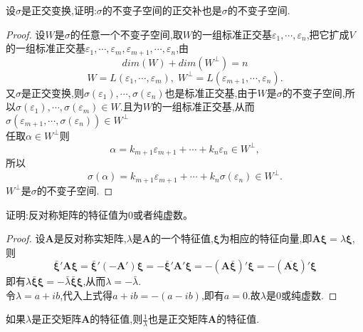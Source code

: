 \documentclass[lang=cn,11pt,normal]{elegantbook}
\renewcommand{\AA}{\boldsymbol{A}}
\newcommand{\varep}{\varepsilon}
\begin{document}
	\begin{exercise}
		设$\sigma$是正交变换,证明:$\sigma$的不变子空间的正交补也是$\sigma$的不变子空间.
	\end{exercise}
	\begin{proof}
		设$W$是$\sigma$的任意一个不变子空间,取$W$的一组标准正交基$\varep_1,\cdots,\varep_n$,把它扩成$V$的一组标准正交基$\varep_1,\cdots,\varep_m,\varep_{m+1},\cdots,\varep_n$,由
		\begin{equation}
		dim(W)+dim(W^\perp)=n
		\end{equation}
		\begin{equation}
		W=L(\varep_1,\cdots,\varep_m),\;W^\perp=L(\varep_{m+1},\cdots,\varep_n).
		\end{equation}
		又$\sigma$是正交变换,则$\sigma(\varep_1),\cdots,\sigma(\varep_n)$也是标准正交基,由于$W$是$\sigma$的不变子空间,所以$\sigma(\varep_1),\cdots,\sigma(\varep_m)\in W$.且为$W$的一组标准正交基,从而$\sigma(\varep_{m+1},\cdots,\sigma(\varep_n))\in W^\perp$\\
		任取$\alpha\in W^\perp$则
		\begin{equation}
		\alpha=k_{m+1}\varep_{m+1}+\cdots+k_n\varep_n\in W^\perp,
		\end{equation}
		所以
		\begin{equation}
		\sigma(\alpha)=k_{m+1}\varep_{m+1}+\cdots+k_n\sigma(\varep_n)\in W^\perp.
		\end{equation}
		$W^\perp$是$\sigma$的不变子空间.
	\end{proof}
	\begin{exercise}
		证明:反对称矩阵的特征值为0或者纯虚数。
	\end{exercise}
	\begin{proof}
		设$\AA$是反对称实矩阵,$\lambda$是$\AA$的一个特征值,$\boldsymbol{\xi}$为相应的特征向量,即$\boldsymbol{A\xi}=\lambda\boldsymbol{\xi}$,则
		\begin{equation}
		\bar{\boldsymbol{\xi}}'\boldsymbol{A\xi}=\bar{\boldsymbol{\xi}}'(-\AA')\boldsymbol{\xi}=-\bar{\boldsymbol{\xi}}'\AA'\boldsymbol{\xi}=-(\AA\bar{\boldsymbol{\xi}})'\boldsymbol{\xi}=-(\overline{\boldsymbol{A\xi}})'\boldsymbol{\xi}
		\end{equation}
		即有$\lambda\bar{\boldsymbol{\xi}}\boldsymbol{\xi}=-\bar{\lambda}\bar{\boldsymbol{\xi}}\boldsymbol{\xi}$,从而$\lambda=-\bar{\lambda}$.\\
		令$\lambda=a+ib$,代入上式得$a+ib=-(a-ib)$,即有$a=0$.故$\lambda$是0或纯虚数.
	\end{proof}
	\begin{exercise}
		如果$\lambda$是正交矩阵$\AA$的特征值,则$\frac{1}{\lambda}$也是正交矩阵$\AA$的特征值.
	\end{exercise}
\end{document}
